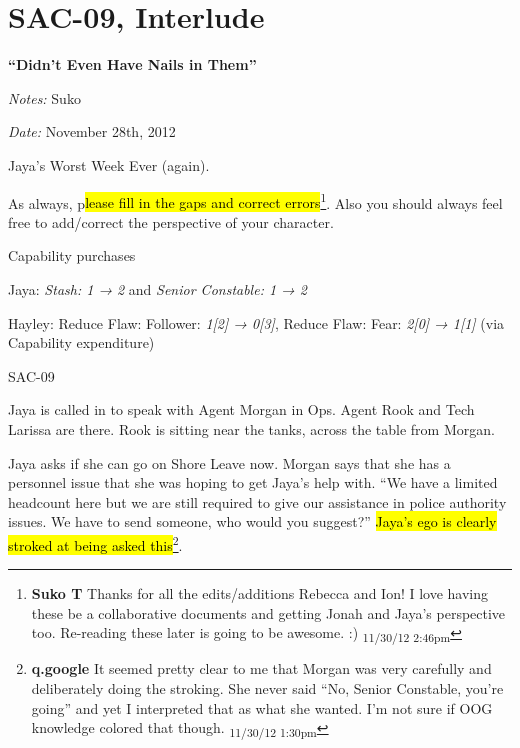 \setcounter{chapter}{ 10 }
\chapter{\textbf{SAC-09, Interlude} }




\begin{center}
 {\LARGE \textbf{``Didn't Even Have Nails in Them''} } 
\end{center}




\textit{Notes:} Suko

\textit{Date:} November 28th, 2012



Jaya's Worst Week Ever (again).  



As always, p\hl{lease fill in the gaps and correct errors}\footnote{\textbf{Suko T }Thanks for all the edits/additions Rebecca and Ion!  I love having these be a collaborative documents and getting Jonah and Jaya's perspective too.  Re-reading these later is going to be awesome.  :) \textsubscript{11/30/12 2:46pm}}.  Also you should always feel free to add/correct the perspective of your character.

\noindent\hrulefill



 {\LARGE Capability purchases } 

Jaya: \textit{Stash: 1 → 2} and \textit{Senior Constable: 1 → 2}

Hayley: Reduce Flaw: Follower: \textit{1{[}2{]} → 0{[}3{]}}, Reduce Flaw: Fear: \textit{2{[}0{]} → 1{[}1{]}} (via Capability expenditure)

\noindent\hrulefill





 {\LARGE SAC-09 } 



Jaya is called in to speak with Agent Morgan in Ops.  Agent Rook and Tech Larissa are there.  Rook is sitting near the tanks, across the table from Morgan.



Jaya asks if she can go on Shore Leave now.  Morgan says that she has a personnel issue that she was hoping to get Jaya's help with.  ``We have a limited headcount here but we are still required to give our assistance in police authority issues.  We have to send someone, who would you suggest?''  \hl{Jaya's ego is clearly stroked at being asked this}\footnote{\textbf{q.google }It seemed pretty clear to me that Morgan was very carefully and deliberately doing the stroking.  She never said ``No, Senior Constable, you're going'' and yet I interpreted that as what she wanted.  I'm not sure if OOG knowledge colored that though. \textsubscript{11/30/12 1:30pm}}.



